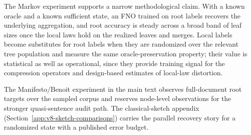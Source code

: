 The Markov experiment supports a narrow methodological claim. With a
known oracle and a known sufficient state, an FNO trained on root
labels recovers the underlying aggregation, and root accuracy is
steady across a broad band of leaf sizes once the local laws hold on
the realized leaves and merges. Local labels become substitutes for
root labels when they are randomized over the relevant tree
population and measure the same oracle-preservation property; their
value is statistical as well as operational, since they provide
training signal for the compression operators and design-based
estimates of local-law distortion.

The Manifesto/Benoit experiment in the main text observes
full-document root targets over the sampled corpus and reserves
node-level observations for the stronger quasi-sentence audit path.
The classical-sketch appendix (Section~\ref{app:v8-sketch-comparisons})
carries the parallel recovery story for a randomized state with a
published error budget.
